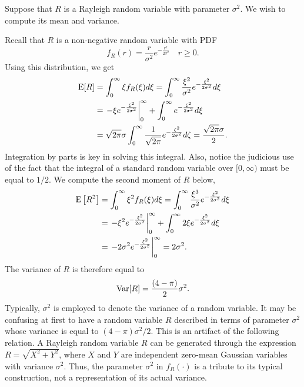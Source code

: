 \begin{example}
Suppose that $R$ is a Rayleigh random variable with parameter $\sigma^2$.
We wish to compute its mean and variance.

Recall that $R$ is a non-negative random variable with PDF
\begin{equation*}
f_R (r) = \frac{r}{\sigma^2} e^{- \frac{r^2}{2 \sigma^2} } \quad r \geq 0 .
\end{equation*}
Using this distribution, we get
\begin{equation*}
\begin{split}
\mathrm{E} [R] &= \int_0^{\infty} \xi f_R(\xi) d\xi
= \int_0^{\infty} \frac{\xi^2}{\sigma^2} e^{- \frac{\xi^2}{2 \sigma^2}} d\xi \\
&= \left. - \xi e^{- \frac{\xi^2}{2 \sigma^2}} \right|_0^{\infty}
+ \int_0^{\infty} e^{- \frac{\xi^2}{2 \sigma^2}} d\xi \\
&= \sqrt{ 2 \pi } \sigma \int_0^{\infty} \frac{1}{\sqrt{2 \pi}} e^{- \frac{\zeta^2}{2 \sigma^2}} d\zeta
= \frac{\sqrt{2 \pi} \sigma}{2} .
\end{split}
\end{equation*}
Integration by parts is key in solving this integral.
Also, notice the judicious use of the fact that the integral of a standard random variable over $[0, \infty)$ must be equal to $1/2$.
We compute the second moment of $R$ below,
\begin{equation*}
\begin{split}
\mathrm{E} \left[ R^2 \right] &= \int_0^{\infty} \xi^2 f_R(\xi) d\xi
= \int_0^{\infty} \frac{\xi^3}{\sigma^2} e^{- \frac{\xi^2}{2 \sigma^2}} d\xi \\
&= \left. - \xi^2 e^{- \frac{\xi^2}{2 \sigma^2}} \right|_0^{\infty}
+ \int_0^{\infty} 2 \xi e^{- \frac{\xi^2}{2 \sigma^2}} d\xi \\
&= \left. - 2 \sigma^2 e^{- \frac{\xi^2}{2 \sigma^2}} \right|_0^{\infty}
= 2 \sigma^2 .
\end{split}
\end{equation*}
The variance of $R$ is therefore equal to
\begin{equation*}
\mathrm{Var} [R] = \frac{(4 - \pi)}{2} \sigma^2 .
\end{equation*}
Typically, $\sigma^2$ is employed to denote the variance of a random variable.
It may be confusing at first to have a random variable $R$ described in terms of parameter $\sigma^2$ whose variance is equal to $(4 - \pi) \sigma^2/2$.
This is an artifact of the following relation.
A Rayleigh random variable $R$ can be generated through the expression $R = \sqrt{X^2 + Y^2}$, where $X$ and $Y$ are independent zero-mean Gaussian variables with variance $\sigma^2$.
Thus, the parameter $\sigma^2$ in $f_R (\cdot)$ is a tribute to its typical construction, not a representation of its actual variance.
\end{example}

